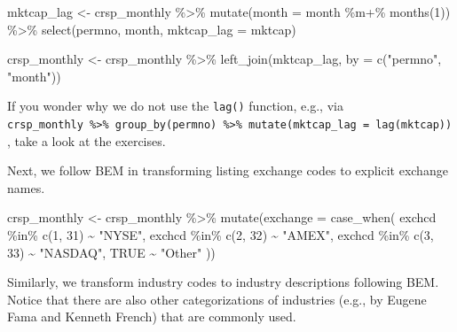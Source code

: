 \documentclass[
]{krantz}
\newenvironment{Shaded}{\begin{snugshade}}{\end{snugshade}}
\newcommand{\AttributeTok}[1]{\textcolor[rgb]{0.61,0.61,0.61}{#1}}
\newcommand{\ConstantTok}[1]{\textcolor[rgb]{0,0,0}{#1}}
\newcommand{\DecValTok}[1]{\textcolor[rgb]{0.06,0.06,0.06}{#1}}
\newcommand{\FunctionTok}[1]{\textcolor[rgb]{0,0,0}{#1}}
\newcommand{\NormalTok}[1]{#1}
\newcommand{\OtherTok}[1]{\textcolor[rgb]{0.37,0.37,0.37}{#1}}
\newcommand{\SpecialCharTok}[1]{\textcolor[rgb]{0,0,0}{#1}}
\newcommand{\StringTok}[1]{\textcolor[rgb]{0.5,0.5,0.5}{#1}}
\begin{document}
\begin{Shaded}
\begin{Highlighting}[]
\NormalTok{mktcap\_lag }\OtherTok{\textless{}{-}}\NormalTok{ crsp\_monthly }\SpecialCharTok{\%\textgreater{}\%}
  \FunctionTok{mutate}\NormalTok{(}\AttributeTok{month =}\NormalTok{ month }\SpecialCharTok{\%m+\%} \FunctionTok{months}\NormalTok{(}\DecValTok{1}\NormalTok{)) }\SpecialCharTok{\%\textgreater{}\%}
  \FunctionTok{select}\NormalTok{(permno, month, }\AttributeTok{mktcap\_lag =}\NormalTok{ mktcap)}

\NormalTok{crsp\_monthly }\OtherTok{\textless{}{-}}\NormalTok{ crsp\_monthly }\SpecialCharTok{\%\textgreater{}\%}
  \FunctionTok{left\_join}\NormalTok{(mktcap\_lag, }\AttributeTok{by =} \FunctionTok{c}\NormalTok{(}\StringTok{"permno"}\NormalTok{, }\StringTok{"month"}\NormalTok{))}
\end{Highlighting}
\end{Shaded}

If you wonder why we do not use the \texttt{lag()} function, e.g., via \texttt{crsp\_monthly\ \%\textgreater{}\%\ group\_by(permno)\ \%\textgreater{}\%\ mutate(mktcap\_lag\ =\ lag(mktcap))}, take a look at the exercises.

Next, we follow BEM in transforming listing exchange codes to explicit exchange names.

\begin{Shaded}
\begin{Highlighting}[]
\NormalTok{crsp\_monthly }\OtherTok{\textless{}{-}}\NormalTok{ crsp\_monthly }\SpecialCharTok{\%\textgreater{}\%}
  \FunctionTok{mutate}\NormalTok{(}\AttributeTok{exchange =} \FunctionTok{case\_when}\NormalTok{(}
\NormalTok{    exchcd }\SpecialCharTok{\%in\%} \FunctionTok{c}\NormalTok{(}\DecValTok{1}\NormalTok{, }\DecValTok{31}\NormalTok{) }\SpecialCharTok{\textasciitilde{}} \StringTok{"NYSE"}\NormalTok{,}
\NormalTok{    exchcd }\SpecialCharTok{\%in\%} \FunctionTok{c}\NormalTok{(}\DecValTok{2}\NormalTok{, }\DecValTok{32}\NormalTok{) }\SpecialCharTok{\textasciitilde{}} \StringTok{"AMEX"}\NormalTok{,}
\NormalTok{    exchcd }\SpecialCharTok{\%in\%} \FunctionTok{c}\NormalTok{(}\DecValTok{3}\NormalTok{, }\DecValTok{33}\NormalTok{) }\SpecialCharTok{\textasciitilde{}} \StringTok{"NASDAQ"}\NormalTok{,}
    \ConstantTok{TRUE} \SpecialCharTok{\textasciitilde{}} \StringTok{"Other"}
\NormalTok{  ))}
\end{Highlighting}
\end{Shaded}

Similarly, we transform industry codes to industry descriptions following BEM. Notice that there are also other categorizations of industries (e.g., by Eugene Fama and Kenneth French) that are commonly used.
\end{document}
